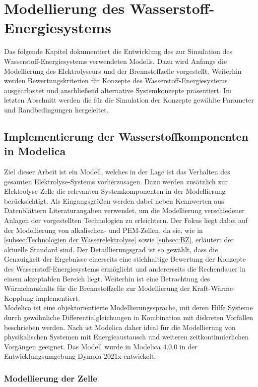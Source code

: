 \chapter{Modellierung des Wasserstoff-Energiesystems}
\label{cha:Methode}
Das folgende Kapitel dokumentiert die Entwicklung des zur Simulation des Wasserstoff-Energiesystems verwendeten Modells.
Dazu wird Anfangs die Modellierung des Elektrolyseurs und der Brennstoffzelle vorgestellt. Weiterhin werden Bewertungskriterien für Konzepte des Wasserstoff-Energiesystems ausgearbeitet und anschließend alternative Systemkonzepte präsentiert. 
Im letzten Abschnitt werden die für die Simulation der Konzepte gewählte Parameter und Randbedingungen hergeleitet.

\section{Implementierung der Wasserstoffkomponenten in Modelica} 
Ziel dieser Arbeit ist ein Modell, welches in der Lage ist das Verhalten des gesamten Elektrolyse-Systems vorherzusagen. Dazu werden zusätzlich zur Elektrolyse-Zelle die relevanten Systemkomponenten in der Modellierung berücksichtigt. Als Eingangsgrößen werden dabei neben Kennwerten aus Datenblättern Literaturangaben verwendet, um die Modellierung verschiedener Anlagen der vorgestellten Technologien zu erleichtern. Der Fokus liegt dabei auf der Modellierung von alkalischen- und PEM-Zellen, da sie, wie in \ref{subsec:Technologien der Wasserelektrolyse} sowie \ref{subsec:BZ}, erläutert der aktuelle Standard sind. Der Detaillierungsgrad ist so gewählt, dass die Genauigkeit der Ergebnisse einerseits eine stichhaltige Bewertung der Konzepte des Wasserstoff-Energiesystems ermöglicht und andererseits die Rechendauer in einem akzeptablen Bereich liegt.
Weiterhin ist eine Betrachtung des Wärmehaushalts für die Brennstoffzelle zur Modellierung der Kraft-Wärme-Kopplung implementiert.\\

Modelica ist eine objektorientierte Modellierungssprache, mit deren Hilfe Systeme durch gewöhnliche Differentialgleichungen in Kombination  mit diskreten Vorfällen beschrieben werden. Nach \citet{schamai_modelica_2009} ist Modelica daher ideal für die Modellierung von physikalischen Systemen mit Energieaustausch und weiteren zeitkontinuierlichen Vorgängen geeignet. Das Modell wurde in Modelica 4.0.0 in der Entwicklungsumgebung Dymola 2021x entwickelt.\\


\subsection{Modellierung der Zelle}\ \\
\label{subsec:Modellierung der Zelle}

